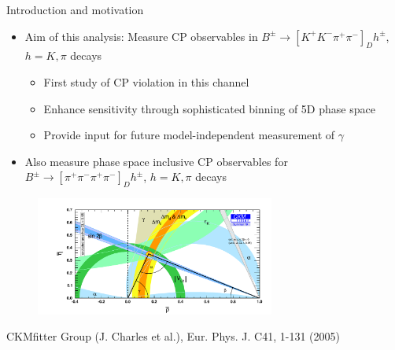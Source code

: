 \documentclass{beamer}
\begin{document}
\begin{frame}{Introduction and motivation}
  \begin{itemize}
    \setlength\itemsep{0.0em}
    \item{Aim of this analysis: Measure CP observables in $B^\pm\to[K^+K^-\pi^+\pi^-]_D h^\pm$, $h = K, \pi$ decays}
    \begin{itemize}
      \setlength\itemsep{0.5em}
      \item{First study of CP violation in this channel}
      \item{Enhance sensitivity through sophisticated binning of 5D phase space}
      \item{Provide input for future model-independent measurement of $\gamma$}
    \end{itemize}
    \item{Also measure phase space inclusive CP observables for $B^\pm\to[\pi^+\pi^-\pi^+\pi^-]_D h^\pm$, $h = K, \pi$ decays}
  \end{itemize}
  \vspace{-0.2cm}
  \begin{figure}
    \includegraphics[width = 0.70\textwidth]{Plots/ckmfitter2.pdf}
  \end{figure}
  \vspace{-0.5cm}
  \begin{center}
    \tiny{CKMfitter Group (J. Charles et al.), Eur. Phys. J. C41, 1-131 (2005)}
  \end{center}
\end{frame}
\end{document}
